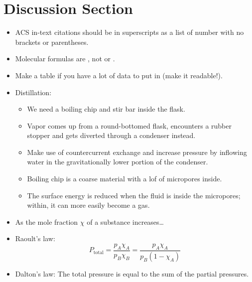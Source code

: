 \documentclass[../notes.tex]{subfiles}
\begin{document}
\section{Discussion Section}
\begin{itemize}
    \item ACS in-text citations should be in superscripts as a list of number with no brackets or parentheses.
    \item Molecular formulas are , not  or .
    \item Make a table if you have a lot of data to put in (make it readable!).
    \item Distillation:
    \begin{itemize}
        \item We need a boiling chip and stir bar inside the flask.
        \item Vapor comes up from a round-bottomed flask, encounters a rubber stopper and gets diverted through a condenser instead.
        \item Make use of countercurrent exchange and increase pressure by inflowing water in the gravitationally lower portion of the condenser.
        \item Boiling chip is a coarse material with a lof of micropores inside.
        \item The surface energy is reduced when the fluid is inside the micropores; within, it can more easily become a gas.
    \end{itemize}
    \item As the mole fraction $\chi$ of a substance  increases\dots
    \item Raoult's law:
    \begin{equation*}
        P_\text{total} = \frac{p_A^{}\chi_A^{}}{p_B^{}\chi_B^{}} = \frac{p_A^{}\chi_A^{}}{p_B^{}(1-\chi_A^{})}
    \end{equation*}
    \item Dalton's law: The total pressure is equal to the sum of the partial pressures.
\end{itemize}
\end{document}
